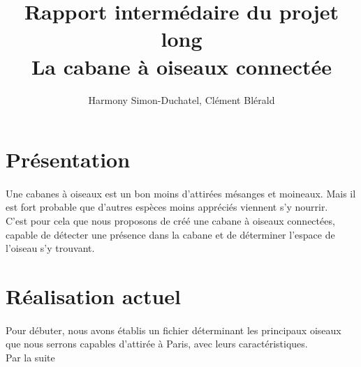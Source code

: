 \documentclass{article}
\title{Rapport intermédaire du projet long \\ La cabane à oiseaux connectée }
\author{Harmony Simon-Duchatel, Clément Blérald}
\begin{document}
\maketitle


\section{Présentation}
\paragraph {}
Une cabanes à oiseaux est un bon moins d'attirées mésanges et moineaux. Mais il est fort probable que d'autres espèces moins appréciés viennent s'y nourrir. \\
C'est pour cela que nous proposons de créé une cabane à oiseaux connectées, capable de détecter une présence dans la cabane et de déterminer l'espace de l'oiseau s'y trouvant. 

\section{Réalisation actuel}
\paragraph {}
Pour débuter, nous avons établis un fichier déterminant les principaux oiseaux que nous serrons capables d'attirée à Paris, avec leurs caractéristiques. \\
Par la suite 
\end{document}

